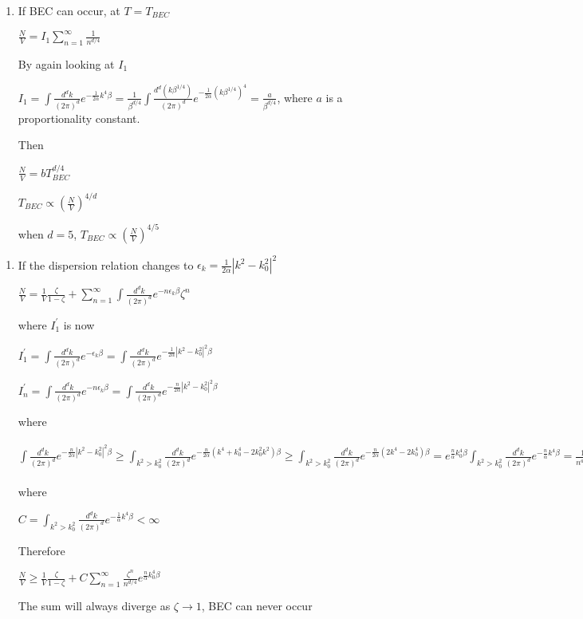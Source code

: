 \documentclass{article}
\begin{document}
    \begin{enumerate}
\def\labelenumi{(\alph{enumi})}
\setcounter{enumi}{1}
\itemsep1pt\parskip0pt
\item
  If BEC can occur, at $T=T_{BEC}$


$\frac{N}{V} = I_1\sum_{n=1}^{\infty}\frac{1}{n^{d/4}}$

By again looking at $I_1$

$ I_1  = \int \frac{d^dk}{(2 \pi)^d} e^{-\frac{1}{2 \alpha} k^4 \beta} = \frac{1}{\beta^{d/4}}\int \frac{d^d(k\beta^{1/4})}{(2 \pi)^d} e^{-\frac{1}{2 \alpha} {(k \beta^{1/4})}^4 }=\frac{a}{\beta^{d/4}}$, where $a$ is a proportionality constant.

Then

$\frac{N}{V}= b T_{BEC}^{d/4}$

$T_{BEC} \propto (\frac{N}{V})^{4/d}$

when $d=5$, $T_{BEC} \propto (\frac{N}{V})^{4/5}$
\end{enumerate}

    \begin{enumerate}
\def\labelenumi{(\alph{enumi})}
\setcounter{enumi}{2}
\itemsep1pt\parskip0pt
\item
  If the dispersion relation changes to
  $\epsilon_k = \frac{1}{2 \alpha} |k^2-k_0^2|^2$


$\frac{N}{V} =\frac{1}{V} \frac{\zeta}{1-\zeta}+\sum_{n=1}^{\infty} \int \frac{d^dk}{(2 \pi)^d} e^{-n\epsilon_k \beta}\zeta^n$

where $I_1^{'}$ is now

 $ I_1^{'} = \int \frac{d^dk}{(2 \pi)^d} e^{-\epsilon_k \beta} = \int \frac{d^dk}{(2 \pi)^d} e^{-\frac{1}{2 \alpha} |k^2-k_0^2|^2 \beta} $
 

$I_n ^{'}= \int \frac{d^dk}{(2 \pi)^d} e^{-n\epsilon_k \beta} = \int \frac{d^dk}{(2 \pi)^d} e^{-\frac{n}{2 \alpha} |k^2-k_0^2|^2 \beta}  $

where

$\int \frac{d^dk}{(2 \pi)^d} e^{-\frac{n}{2 \alpha} |k^2-k_0^2|^2 \beta} \ge \int_{k^2>k_0^2} \frac{d^dk}{(2 \pi)^d} e^{-\frac{n}{2 \alpha} (k^4+k_0^4-2k_0^2k^2) \beta} \ge \int_{k^2>k_0^2} \frac{d^dk}{(2 \pi)^d} e^{-\frac{n}{2 \alpha} (2k^4-2k_0^4) \beta} = e^{\frac{n}{ \alpha}k_0^4 \beta}\int_{k^2>k_0^2} \frac{d^dk}{(2 \pi)^d} e^{-\frac{n}{ \alpha} k^4 \beta} = \frac{1}{n^{d/4}}e^{\frac{n}{ \alpha}k_0^4 \beta}\int_{(k(n)^{1/4})^2>(k_0(n)^{1/4})^2} \frac{d^d(k(n)^{1/4})}{(2 \pi)^d} e^{-\frac{1}{ \alpha} (k(n)^{1/4})^4 \beta} \ge \frac{1}{n^{d/4}}e^{\frac{n}{ \alpha}k_0^4 \beta}\int_{(k(n)^{1/4})^2>k_0^2} \frac{d^d(k(n)^{1/4})}{(2 \pi)^d} e^{-\frac{1}{ \alpha} (k(n)^{1/4})^4 \beta} = C \frac{1}{n^{d/4}}e^{\frac{n}{ \alpha}k_0^4 \beta}$

where

$C= \int_{k^2>k_0^2} \frac{d^dk}{(2 \pi)^d} e^{-\frac{1}{ \alpha} k^4 \beta} < \infty$

Therefore

$\frac{N}{V} \ge \frac{1}{V} \frac{\zeta}{1-\zeta}+C \sum_{n=1}^{\infty} \frac{\zeta^n}{n^{d/4}}e^{\frac{n}{ \alpha}k_0^4 \beta}$

The sum will always diverge as $\zeta \rightarrow1$, BEC can never occur
\end{enumerate}
\end{document}
